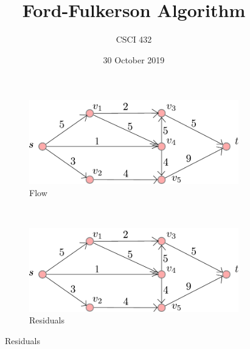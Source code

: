 \documentclass{article}
\title{Ford-Fulkerson Algorithm}
\author{CSCI 432}
\date{30 October 2019}
\begin{document}
\begin{figure}

    \centering

    \begin{subfigure}[b]{.45\textwidth}

        \includegraphics[width=\textwidth]{../figs/graph}\caption*{Flow}

    \end{subfigure}

    ~~

    \begin{subfigure}[b]{.45\textwidth}

        \includegraphics[width=\textwidth]{../figs/graph}\caption*{Residuals}

    \end{subfigure}

\end{figure}
\end{document}
